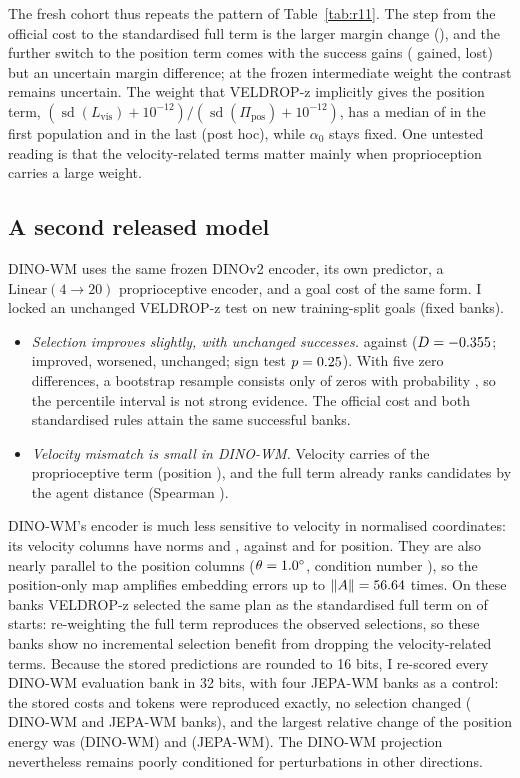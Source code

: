 The fresh cohort thus repeats the pattern of Table~\ref{tab:r11}. The step from the official cost to the standardised
full term is the larger margin change (\RThStdRawD), and the further switch to the position term comes with the success
gains (\RThGain{} gained, \RThLoss{} lost) but an uncertain margin difference; at the frozen intermediate weight the
contrast remains uncertain. The weight that VELDROP-z implicitly gives the position term,
$(\operatorname{sd}(L_{\mathrm{vis}})+10^{-12})/(\operatorname{sd}(\Pi_{\mathrm{pos}})+10^{-12})$, has a median of \RTwVZWFirst{} in the
first population and \RTwVZWLast{} in the last (post hoc), while $\alpha_0$ stays fixed. One untested reading is that
the velocity-related terms matter mainly when proprioception carries a large weight.

\subsection{A second released model}
\label{sec:r10}
DINO-WM uses the same frozen DINOv2 encoder, its own predictor, a $\mathrm{Linear}(4\to20)$ proprioceptive encoder, and
a goal cost of the same form. I locked an unchanged \mbox{VELDROP-z} test on \RTenN{} new training-split goals (fixed banks).
\begin{itemize}[leftmargin=*,itemsep=1pt]
\item \emph{Selection improves slightly, with unchanged successes.} \RTenVZ{} against \RTenBzero{} ($D=-0.355$; \RTenVZImp{} improved,
  \RTenVZWor{} worsened, \RTenUnchanged{} unchanged; sign test $p=0.25$). With five zero differences, a bootstrap
  resample consists only of zeros with probability \BootZeroRTen, so the percentile interval is not strong evidence.
  The official cost and both standardised rules attain the same \RTenBzeroSucc{} successful banks.
\item \emph{Velocity mismatch is small in DINO-WM.} Velocity carries \DecDnVel{} of the proprioceptive term (position
  \DecDnPos), and the full term already ranks candidates by the agent distance (Spearman \DecDnSpFull).
\end{itemize}
DINO-WM's encoder is much less sensitive to velocity in normalised coordinates: its velocity columns have norms
\EncDinoVx{} and \EncDinoVy, against \EncDinoX{} and \EncDinoY{} for position. They are also nearly parallel to the
position columns ($\theta=1.0^\circ$, condition number \CondDn), so the position-only map amplifies embedding errors
up to $\|A\|=56.64$ times. On these banks VELDROP-z selected the same plan as the standardised full term on
\SameSelDino{} of \SameSelDinoN{} starts: re-weighting the full term reproduces the observed selections, so these banks
show no incremental selection benefit from dropping the velocity-related terms. Because the stored predictions are
rounded to 16 bits, I re-scored every DINO-WM evaluation bank in 32 bits, with four JEPA-WM banks as a control: the
stored costs and tokens were reproduced exactly, no selection changed (\FpDnN{} DINO-WM and \FpJN{} JEPA-WM banks), and
the largest relative change of the position energy was \FpDnMaxRel{} (DINO-WM) and \FpJMaxRel{} (JEPA-WM). The
DINO-WM projection nevertheless remains poorly conditioned for perturbations in other directions.

